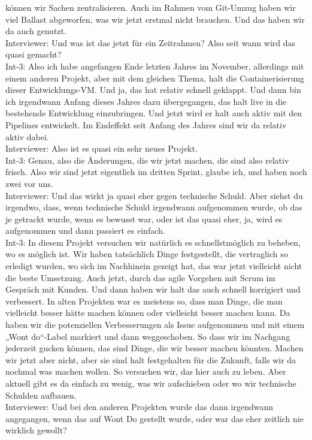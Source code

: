 können wir Sachen zentralisieren. Auch im Rahmen vom Git-Umzug haben wir viel Ballast abgeworfen, was wir jetzt erstmal nicht brauchen. Und das haben wir da auch genutzt. \\
Interviewer: Und was ist das jetzt für ein Zeitrahmen? Also seit wann wird das quasi gemacht? \\
Int-3: Also ich habe angefangen Ende letzten Jahres im November, allerdings mit einem anderen Projekt, aber mit dem gleichen Thema, halt die Containerisierung dieser Entwicklungs-VM. Und ja, das hat relativ schnell geklappt. Und dann bin ich irgendwann Anfang dieses Jahres dazu übergegangen, das halt live in die bestehende Entwicklung einzubringen. Und jetzt wird er halt auch aktiv mit den Pipelines entwickelt. Im Endeffekt seit Anfang des Jahres sind wir da relativ aktiv dabei. \\
Interviewer: Also ist es quasi ein sehr neues Projekt. \\
Int-3: Genau, also die Änderungen, die wir jetzt machen, die sind also relativ frisch. Also wir sind jetzt eigentlich im dritten Sprint, glaube ich, und haben noch zwei vor uns.\\
Interviewer: Und das wirkt ja quasi eher gegen technische Schuld. Aber siehst du irgendwo, dass, wenn technische Schuld irgendwann aufgenommen wurde, ob das je getrackt wurde, wenn es bewusst war, oder ist das quasi eher, ja, wird es aufgenommen und dann passiert es einfach.\\
Int-3: In diesem Projekt versuchen wir natürlich es schnellstmöglich zu beheben, wo es möglich ist. Wir haben tatsächlich Dinge festgestellt, die vertraglich so erledigt wurden, wo sich im Nachhinein gezeigt hat, das war jetzt vielleicht nicht die beste Umsetzung. Auch jetzt, durch das agile Vorgehen mit Scrum im Gespräch mit Kunden. Und dann haben wir halt das auch schnell korrigiert und verbessert. In alten Projekten war es meistens so, dass man Dinge, die man vielleicht besser hätte machen können oder vielleicht besser machen kann. Da haben wir die potenziellen Verbesserungen als Issue aufgenommen und mit einem „Wont do“-Label markiert und dann weggeschoben. So dass wir im Nachgang jederzeit gucken können, das sind Dinge, die wir besser machen könnten. Machen wir jetzt aber nicht, aber sie sind halt festgehalten für die Zukunft, falls wir da nochmal was machen wollen. So versuchen wir, das hier auch zu leben. Aber aktuell gibt es da einfach zu wenig, was wir aufschieben oder wo wir technische Schulden aufbauen. \\
Interviewer: Und bei den anderen Projekten wurde das dann irgendwann angegangen, wenn das auf Wont Do gestellt wurde, oder war das eher zeitlich nie wirklich gewollt?\\
